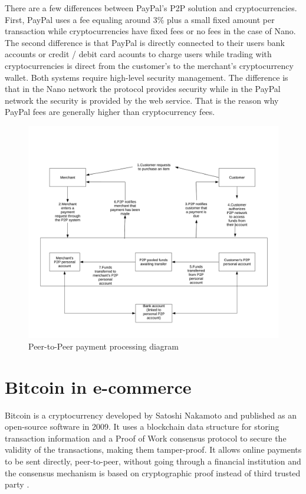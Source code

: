 \documentclass{ferseminar}
\begin{document}
There are a few differences between PayPal's P2P solution and cryptocurrencies. First, PayPal uses a fee equaling around 3\% plus a small fixed amount per transaction while cryptocurrencies have fixed fees or no fees in the case of Nano. The second difference is that PayPal is directly connected to their users bank accounts or credit / debit card acounts to charge users while trading with cryptocurrencies is direct from the customer's to the merchant's cryptocurrency wallet. Both systems require high-level security management. The difference is that in the Nano network the protocol provides security while in the PayPal network the security is provided by the web service. That is the reason why PayPal fees are generally higher than cryptocurrency fees.
\begin{figure}
	\caption{Peer-to-Peer payment processing diagram}
	\includegraphics[scale=0.6]{diagram3}
	\centering
\end{figure}


\section{Bitcoin in e-commerce}

Bitcoin is a cryptocurrency developed by Satoshi Nakamoto and published as an open-source software in 2009. It uses a blockchain data structure for storing transaction information and a Proof of Work consensus protocol to secure the validity of the transactions, making them tamper-proof. It allows online payments to be sent directly, peer-to-peer, without going through a financial institution and the consensus mechanism is based on cryptographic proof instead of third trusted party \cite{Bitcoin}.
\end{document}
